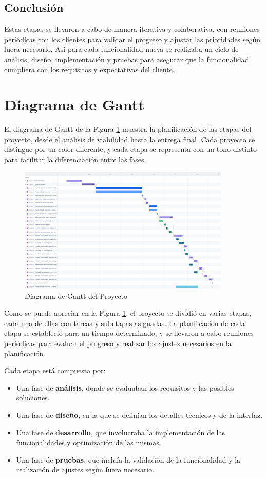 \subsection{Conclusión}	  
Estas etapas se llevaron a cabo de manera iterativa y colaborativa, con reuniones periódicas
con los clientes para validar el progreso y ajustar las prioridades según fuera necesario.
Así para cada funcionalidad nueva se realizaba un ciclo de análisis, diseño, implementación y pruebas
para asegurar que la funcionalidad cumpliera con los requisitos y expectativas del cliente.


\section{Diagrama de Gantt}
El diagrama de Gantt de la Figura \ref{fig:gantt_chart} muestra la planificación de las etapas del proyecto, 
desde el análisis de viabilidad hasta la entrega final. Cada proyecto se distingue por un color diferente, y 
cada etapa se representa con un tono distinto para facilitar la diferenciación entre las fases.

\begin{figure}[H]
  \centering
  \includegraphics[width=0.9\textwidth]{imaxes/gantt_chart}
  \caption{Diagrama de Gantt del Proyecto}
  \label{fig:gantt_chart}
\end{figure}

Como se puede apreciar en la Figura \ref{fig:gantt_chart}, el proyecto se dividió en varias etapas, cada una 
de ellas con tareas y subetapas asignadas. La planificación de cada etapa se estableció para un tiempo determinado, 
y se llevaron a cabo reuniones periódicas para evaluar el progreso y realizar los ajustes necesarios en la planificación.

Cada etapa está compuesta por:
\begin{itemize}
    \item Una fase de \textbf{análisis}, donde se evaluaban los requisitos y las posibles soluciones.
    \item Una fase de \textbf{diseño}, en la que se definían los detalles técnicos y de la interfaz.
    \item Una fase de \textbf{desarrollo}, que involucraba la implementación de las funcionalidades y optimización de las mismas.
    \item Una fase de \textbf{pruebas}, que incluía la validación de la funcionalidad y la realización de ajustes según fuera necesario.
\end{itemize}

